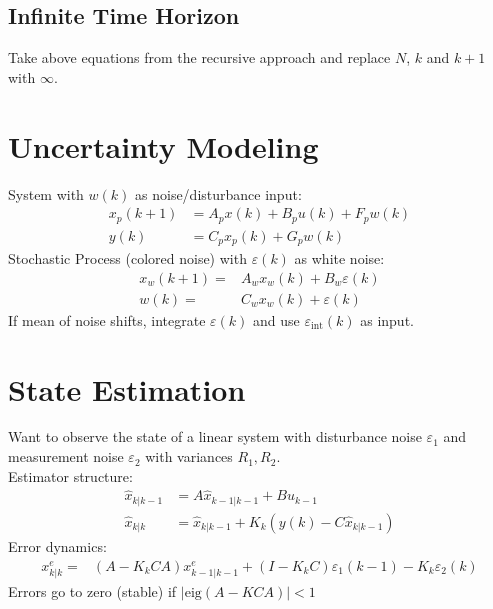\documentclass[a4paper,landscape,8pt,fleqn]{scrartcl}
\begin{document}
\begin{multicols}{3}
\subsection{Infinite Time Horizon}
Take above equations from the recursive approach and replace $N$, $k$ and $k+1$ with $\infty$.

\section{Uncertainty Modeling}
System with $w(k)$ as noise/disturbance input:
\begin{align*}
	x_p(k+1) &= A_p x(k) + B_p u(k) + F_p w(k)\\
	y(k) &= C_p x_p(k) + G_p w(k)
\end{align*}
Stochastic Process (colored noise) with $\varepsilon(k)$ as white noise:
\begin{align*}
	x_w(k+1)= & A_w x_w(k)+B_w\varepsilon(k)\\
	w(k) = & C_w x_w(k)+\varepsilon(k) 
\end{align*}
If mean of noise shifts, integrate $\varepsilon(k)$ and use $\varepsilon_{\mathrm{int}}(k)$ as input.
\section{State Estimation}
Want to observe the state of a linear system with disturbance noise $\varepsilon_1$ and measurement noise $\varepsilon_2$ with variances $R_1,R_2$. \\
Estimator structure:
\begin{align*}
	\hat{x}_{k|k-1} &= A \hat{x}_{k-1|k-1} + B u_{k-1} \\
	\hat{x}_{k|k} &= \hat{x}_{k|k-1} + K_k(y(k)- C \hat{x}_{k|k-1})
\end{align*}
Error dynamics:
\begin{align*}
	x^e_{k|k} = &\left( A- K_k C A\right)x^e_{k-1|k-1}+ \left(I - K_k C\right)\varepsilon_1(k-1) - K_k\varepsilon_2(k)
\end{align*}
Errors go to zero (stable) if $|\mathrm{eig}(A - K C A)| < 1$

\end{multicols}
\end{document}
